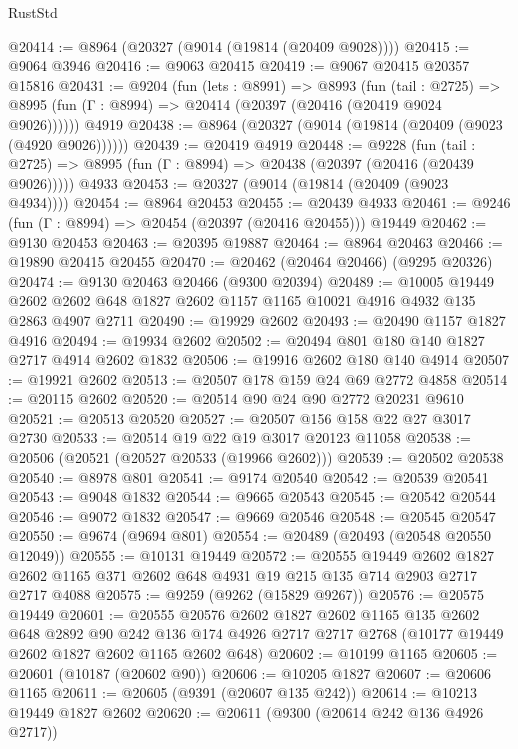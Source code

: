 \begin{lexlean}{RustStd}
\begin{coremodule}
@20414 := @8964 (@20327 (@9014 (@19814 (@20409 @9028))))
@20415 := @9064 @3946
@20416 := @9063 @20415
@20419 := @9067 @20415 @20357 @15816
@20431 := @9204
    (fun (lets : @8991) =>
    @8993
      (fun (tail : @2725) =>
      @8995 (fun (Γ : @8994) => @20414 (@20397 (@20416 (@20419 @9024 @9026))))))
    @4919
@20438 := @8964 (@20327 (@9014 (@19814 (@20409 (@9023 (@4920 @9026))))))
@20439 := @20419 @4919
@20448 := @9228
    (fun (tail : @2725) => @8995 (fun (Γ : @8994) => @20438 (@20397 (@20416 (@20439 @9026)))))
    @4933
@20453 := @20327 (@9014 (@19814 (@20409 (@9023 @4934))))
@20454 := @8964 @20453
@20455 := @20439 @4933
@20461 := @9246 (fun (Γ : @8994) => @20454 (@20397 (@20416 @20455))) @19449
@20462 := @9130 @20453
@20463 := @20395 @19887
@20464 := @8964 @20463
@20466 := @19890 @20415 @20455
@20470 := @20462 (@20464 @20466) (@9295 @20326)
@20474 := @9130 @20463 @20466 (@9300 @20394)
@20489 := @10005
    @19449
    @2602
    @2602
    @648
    @1827
    @2602
    @1157
    @1165
    @10021
    @4916
    @4932
    @135
    @2863
    @4907
    @2711
@20490 := @19929 @2602
@20493 := @20490 @1157 @1827 @4916
@20494 := @19934 @2602
@20502 := @20494 @801 @180 @140 @1827 @2717 @4914 @2602 @1832
@20506 := @19916 @2602 @180 @140 @4914
@20507 := @19921 @2602
@20513 := @20507 @178 @159 @24 @69 @2772 @4858
@20514 := @20115 @2602
@20520 := @20514 @90 @24 @90 @2772 @20231 @9610
@20521 := @20513 @20520
@20527 := @20507 @156 @158 @22 @27 @3017 @2730
@20533 := @20514 @19 @22 @19 @3017 @20123 @11058
@20538 := @20506 (@20521 (@20527 @20533 (@19966 @2602)))
@20539 := @20502 @20538
@20540 := @8978 @801
@20541 := @9174 @20540
@20542 := @20539 @20541
@20543 := @9048 @1832
@20544 := @9665 @20543
@20545 := @20542 @20544
@20546 := @9072 @1832
@20547 := @9669 @20546
@20548 := @20545 @20547
@20550 := @9674 (@9694 @801)
@20554 := @20489 (@20493 (@20548 @20550 @12049))
@20555 := @10131 @19449
@20572 := @20555
    @19449
    @2602
    @1827
    @2602
    @1165
    @371
    @2602
    @648
    @4931
    @19
    @215
    @135
    @714
    @2903
    @2717
    @2717
    @4088
@20575 := @9259 (@9262 (@15829 @9267))
@20576 := @20575 @19449
@20601 := @20555
    @20576
    @2602
    @1827
    @2602
    @1165
    @135
    @2602
    @648
    @2892
    @90
    @242
    @136
    @174
    @4926
    @2717
    @2717
    @2768
    (@10177 @19449 @2602 @1827 @2602 @1165 @2602 @648)
@20602 := @10199 @1165
@20605 := @20601 (@10187 (@20602 @90))
@20606 := @10205 @1827
@20607 := @20606 @1165
@20611 := @20605 (@9391 (@20607 @135 @242))
@20614 := @10213 @19449 @1827 @2602
@20620 := @20611 (@9300 (@20614 @242 @136 @4926 @2717))

\end{coremodule}
\end{lexlean}
